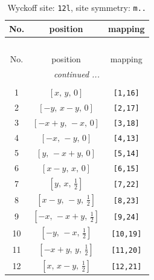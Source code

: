 \documentclass[fleqn,8pt]{jsarticle}
\begin{document}
\begin{longtable}{ccc}
\caption{Wyckoff site: {\tt 12l}, site symmetry: {\tt m..}}
 \\
 \hline \hline
No. & position & mapping \\ \hline \endfirsthead

\multicolumn{2}{l}{\tablename\ \thetable{}} \\
 \hline \hline
No. & position & mapping \\ \hline \endhead

 \hline \hline
\multicolumn{2}{r}{\footnotesize\it continued ...} \\ \endfoot

 \hline \hline
\multicolumn{2}{r}{} \\ \endlastfoot

1 & $\left[ x,\, y,\, 0 \right]$ & {\tt [1,16]} \\ \hline
2 & $\left[ - y,\, x - y,\, 0 \right]$ & {\tt [2,17]} \\ \hline
3 & $\left[ - x + y,\, - x,\, 0 \right]$ & {\tt [3,18]} \\ \hline
4 & $\left[ - x,\, - y,\, 0 \right]$ & {\tt [4,13]} \\ \hline
5 & $\left[ y,\, - x + y,\, 0 \right]$ & {\tt [5,14]} \\ \hline
6 & $\left[ x - y,\, x,\, 0 \right]$ & {\tt [6,15]} \\ \hline
7 & $\left[ y,\, x,\, \frac{1}{2} \right]$ & {\tt [7,22]} \\ \hline
8 & $\left[ x - y,\, - y,\, \frac{1}{2} \right]$ & {\tt [8,23]} \\ \hline
9 & $\left[ - x,\, - x + y,\, \frac{1}{2} \right]$ & {\tt [9,24]} \\ \hline
10 & $\left[ - y,\, - x,\, \frac{1}{2} \right]$ & {\tt [10,19]} \\ \hline
11 & $\left[ - x + y,\, y,\, \frac{1}{2} \right]$ & {\tt [11,20]} \\ \hline
12 & $\left[ x,\, x - y,\, \frac{1}{2} \right]$ & {\tt [12,21]} \\
\end{longtable}
\renewcommand{\arraystretch}{1.2}
\end{document}
